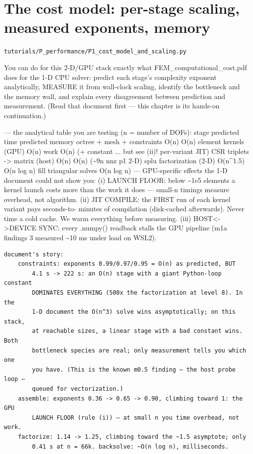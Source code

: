 \chapter{The cost model: per-stage scaling, measured exponents, memory}
\label{ch:P1_cost_model_and_scaling}
\noindent\texttt{tutorials/P\_performance/P1\_cost\_model\_and\_scaling.py}\\[0.75em]
\begin{outcome}
You can do for this 2-D/GPU stack exactly what
FEM\_computational\_cost.pdf does for the 1-D CPU solver: predict each
stage's complexity exponent analytically, MEASURE it from wall-clock
scaling, identify the bottleneck and the memory wall, and explain every
disagreement between prediction and measurement. (Read that document
first — this chapter is its hands-on continuation.)
\end{outcome}

— the analytical table you are testing (n = number of DOFs):
    stage                          predicted time     predicted memory
    octree + mesh + constraints    O(n)               O(n)
    element kernels (GPU)          O(n) work          O(n) (+ constant
                                   ... but see (ii)!    per-variant JIT)
    CSR triplets -> matrix (host)  O(n)               O(n) (\textasciitilde{}9n nnz p1 2-D)
    splu factorization (2-D)       O(n\textasciicircum{}1.5)           O(n log n) fill
    triangular solves              O(n log n)         —
GPU-specific effects the 1-D document could not show you:
  (i) LAUNCH FLOOR: below \textasciitilde{}1e5 elements a kernel launch costs more than
      the work it does — small-n timings measure overhead, not algorithm.
 (ii) JIT COMPILE: the FIRST run of each kernel variant pays seconds-to-
      minutes of compilation (disk-cached afterwards). Never time a cold
      cache. We warm everything before measuring.
(iii) HOST<->DEVICE SYNC: every .numpy() readback stalls the GPU pipeline
      (m1a findings 3 measured \textasciitilde{}10 ms under load on WSL2).

\begin{expected}
\begin{verbatim}
document's story:
    constraints: exponents 0.99/0.97/0.95 = O(n) as predicted, BUT
        4.1 s -> 222 s: an O(n) stage with a giant Python-loop constant
        DOMINATES EVERYTHING (500x the factorization at level 8). In the
        1-D document the O(n^3) solve wins asymptotically; on this stack,
        at reachable sizes, a linear stage with a bad constant wins. Both
        bottleneck species are real; only measurement tells you which one
        you have. (This is the known m0.5 finding — the host probe loop —
        queued for vectorization.)
    assemble: exponents 0.36 -> 0.65 -> 0.90, climbing toward 1: the GPU
        LAUNCH FLOOR (rule (i)) — at small n you time overhead, not work.
    factorize: 1.14 -> 1.25, climbing toward the ~1.5 asymptote; only
        0.41 s at n = 66k. backsolve: ~O(n log n), milliseconds.
\end{verbatim}
\end{expected}

